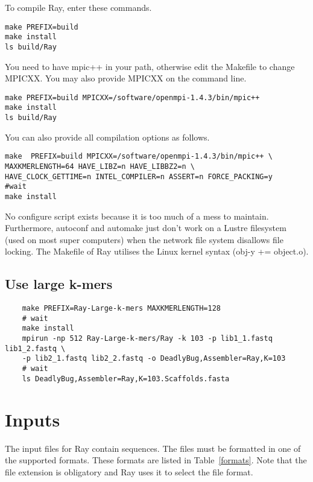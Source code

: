 \documentclass{article}
\begin{document}
To compile Ray, enter these commands.

\begin{verbatim}
make PREFIX=build
make install
ls build/Ray
\end{verbatim}


You need to have mpic++ in your path, otherwise edit the Makefile to change MPICXX.
You may also provide MPICXX on the command line.

\begin{verbatim}
make PREFIX=build MPICXX=/software/openmpi-1.4.3/bin/mpic++
make install
ls build/Ray
\end{verbatim}

You can also provide all compilation options as follows.

\begin{verbatim}
make  PREFIX=build MPICXX=/software/openmpi-1.4.3/bin/mpic++ \
MAXKMERLENGTH=64 HAVE_LIBZ=n HAVE_LIBBZ2=n \
HAVE_CLOCK_GETTIME=n INTEL_COMPILER=n ASSERT=n FORCE_PACKING=y
#wait 
make install
\end{verbatim}


No configure script exists because it is too much of a mess to maintain.
Furthermore, autoconf and automake just don't work on a Lustre filesystem (used on most
super computers) when the network file system disallows file locking.
The Makefile of Ray utilises the Linux kernel syntax (obj-y += object.o).

\subsection{Use large k-mers}

\begin{verbatim}
	make PREFIX=Ray-Large-k-mers MAXKMERLENGTH=128
	# wait
	make install
	mpirun -np 512 Ray-Large-k-mers/Ray -k 103 -p lib1_1.fastq lib1_2.fastq \
	-p lib2_1.fastq lib2_2.fastq -o DeadlyBug,Assembler=Ray,K=103
	# wait
	ls DeadlyBug,Assembler=Ray,K=103.Scaffolds.fasta
\end{verbatim}


\section{Inputs}

The input files for Ray contain sequences. The files must be formatted in one of the supported formats.
These formats are listed in Table~\ref{formats}. Note that the file extension is obligatory and Ray uses it
to select the file format.
\end{document}
